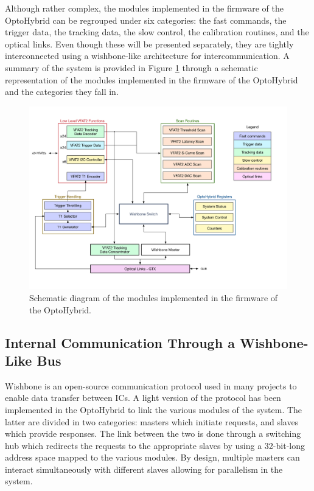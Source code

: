     Although rather complex, the modules implemented in the firmware of the OptoHybrid can be regrouped under six categories: the fast commands, the trigger data, the tracking data, the slow control, the calibration routines, and the optical links. Even though these will be presented separately, they are tightly interconnected using a wishbone-like \cite{wishbone} architecture for intercommunication. A summary of the system is provided in Figure \ref{fig:II-3-sys} through a schematic representation of the modules implemented in the firmware of the OptoHybrid and the categories they fall in.

    \begin{figure}[h!]
      \centering
      \includegraphics[width=\textwidth]{img/II-3-test-beam/system}
      \caption{Schematic diagram of the modules implemented in the firmware of the OptoHybrid.}
      \label{fig:II-3-sys}
    \end{figure}

    \subsection{Internal Communication Through a Wishbone-Like Bus}

      Wishbone is an open-source communication protocol used in many projects to enable data transfer between ICs. A light version of the protocol has been implemented in the OptoHybrid to link the various modules of the system. The latter are divided in two categories: masters which initiate requests, and slaves which provide responses. The link between the two is done through a switching hub which redirects the requests to the appropriate slaves by using a 32-bit-long address space mapped to the various modules. By design, multiple masters can interact simultaneously with different slaves allowing for parallelism in the system. \\

